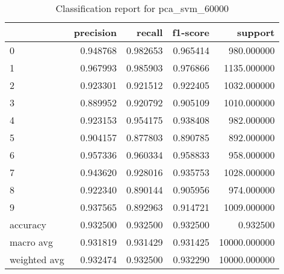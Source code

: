 \begin{table}[htb!]
\centering
\caption{Classification report for pca_svm_60000}
\label{tab:classification-report-pca_svm_60000}
\begin{tabular}{lrrrr}
\toprule
 & precision & recall & f1-score & support \\
\midrule
0 & 0.948768 & 0.982653 & 0.965414 & 980.000000 \\
1 & 0.967993 & 0.985903 & 0.976866 & 1135.000000 \\
2 & 0.923301 & 0.921512 & 0.922405 & 1032.000000 \\
3 & 0.889952 & 0.920792 & 0.905109 & 1010.000000 \\
4 & 0.923153 & 0.954175 & 0.938408 & 982.000000 \\
5 & 0.904157 & 0.877803 & 0.890785 & 892.000000 \\
6 & 0.957336 & 0.960334 & 0.958833 & 958.000000 \\
7 & 0.943620 & 0.928016 & 0.935753 & 1028.000000 \\
8 & 0.922340 & 0.890144 & 0.905956 & 974.000000 \\
9 & 0.937565 & 0.892963 & 0.914721 & 1009.000000 \\
accuracy & 0.932500 & 0.932500 & 0.932500 & 0.932500 \\
macro avg & 0.931819 & 0.931429 & 0.931425 & 10000.000000 \\
weighted avg & 0.932474 & 0.932500 & 0.932290 & 10000.000000 \\
\bottomrule
\end{tabular}
\end{table}
